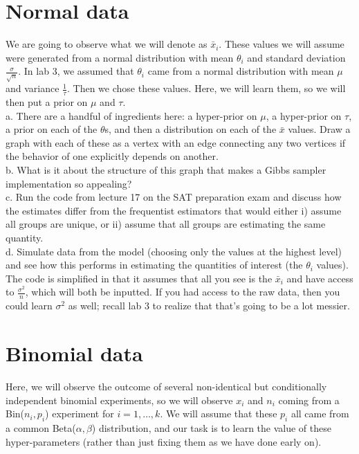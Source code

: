 \documentclass{article}
\begin{document}
\section{Normal data}  
We are going to observe what we will denote as $\bar{x}_i$.  These values we will assume were generated from a normal distribution with mean $\theta_i$ and standard deviation $\frac{\sigma}{\sqrt{n}}$.  In lab 3, we assumed that $\theta_i$ came from a normal distribution with mean $\mu$ and variance $\frac{1}{\tau}$.   Then we chose these values.  Here, we will learn them, so we will then put a prior on $\mu$ and $\tau$.\\[5pt]
a. There are a handful of ingredients here: a hyper-prior on $\mu$, a hyper-prior on $\tau$, a prior on each of the $\theta$s, and then a distribution on each of the $\bar{x}$ values.  Draw a graph with each of these as a vertex with an edge connecting any two vertices if the behavior of one explicitly depends on another.\\[10pt]
b.  What is it about the structure of this graph that makes a Gibbs sampler implementation so appealing?\\[10pt]
c.  Run the code from lecture 17 on the SAT preparation exam and discuss how the estimates differ from the frequentist estimators that would either i) assume all groups are unique, or ii) assume that all groups are estimating the same quantity.\\[10pt]
d.  Simulate data from the model (choosing only the values at the highest level) and see how this performs in estimating the quantities of interest (the $\theta_i$ values).   The code is simplified in that it assumes that all you see is the $\bar{x}_i$ and have access to $\frac{\sigma^2}{n}$, which will both be inputted. If you had access to the raw data, then you could learn $\sigma^2$ as well; recall lab 3 to realize that that's going to be a lot messier. 
\section{Binomial data}
Here, we will observe the outcome of several non-identical but conditionally independent binomial experiments, so we will observe $x_i$ and $n_i$ coming from a Bin($n_i, p_i$) experiment for $i=1,\dots,k$.  We will assume that these $p_i$ all came from a common Beta($\alpha,\beta$) distribution, and our task is to learn the value of these hyper-parameters (rather than just fixing them as we have done early on).\\
\end{document}
